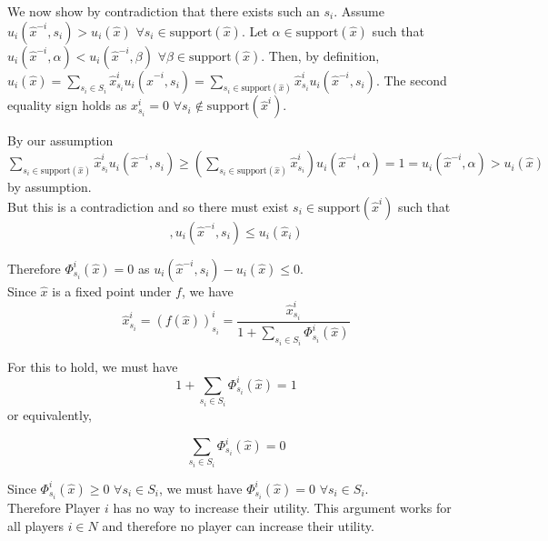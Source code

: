 \documentclass[12pt]{article}
\begin{document}
We now show by contradiction that there exists such an $s_i$. Assume $u_i(\hat{x}^{-i}, s_i) > u_i(\hat{x})$ $\forall s_i \in \text{support}(\hat{x})$. Let $\alpha \in \text{support}(\hat{x})$ such that $u_i(\hat{x}^{-i}, \alpha) < u_i(\hat{x}^{-i}, \beta)$ $\forall \beta \in \text{support}(\hat{x})$. Then, by definition, $u_i(\hat{x}) = \sum\limits_{s_i \in S_i} \hat{x}^i_{s_i} u_i(\hat{x}^{-i},s_i) = \sum\limits_{s_i \in \text{support}(\hat{x})} \hat{x}^i_{s_i} u_i(\hat{x}^{-i},s_i)$. The second equality sign holds as $x^i_{s_i} = 0$ $\forall  s_i \notin \text{support}(\hat{x}^i)$.

By our assumption $\sum\limits_{s_i \in \text{support}(\hat{x})} \hat{x}^i_{s_i} u_i(\hat{x}^{-i},s_i) \geq (\sum\limits_{s_i \in \text{support}(\hat{x})} \hat{x}^i_{s_i})u_i(\hat{x}^{-i}, \alpha) = 1 = u_i(\hat{x}^{-i}, \alpha) > u_i(\hat{x})$ by assumption.\\

But this is a contradiction and so there must exist $s_i \in \text{support}(\hat{x}^i)$ such that 
\begin{equation*},
u_i(\hat{x}^{-i},s_i) \leq u_i(\hat{x}_i)
\end{equation*}

Therefore $\Phi^i_{s_i}(\hat{x}) = 0$ as $u_i(\hat{x}^{-i},s_i) - u_i(\hat{x}) \leq 0$.\\

Since $\hat{x}$ is a fixed point under $f$, we have 
\begin{equation*}
\hat{x}^i_{s_i} = (f(\hat{x}))^i_{s_i} = \dfrac{\hat{x}^i_{s_i}}{1 + \sum\limits_{s_i \in S_i} \Phi^i_{s_i}(\hat{x})}
\end{equation*}
 
For this to hold, we must have
\begin{equation*}
1 + \sum\limits_{s_i \in S_i} \Phi^i_{s_i}(\hat{x}) = 1
\end{equation*}
or equivalently,

\begin{equation*}
\sum\limits_{s_i \in S_i} \Phi^i_{s_i}(\hat{x}) = 0
\end{equation*}

Since $\Phi^i_{s_i}(\hat{x}) \geq 0$ $\forall s_i \in S_i$, we must have $\Phi^i_{s_i}(\hat{x}) = 0$ $\forall s_i \in S_i$.\\

Therefore Player $i$ has no way to increase their utility. This argument works for all players $i \in N$ and therefore no player can increase their utility.
\end{document}
